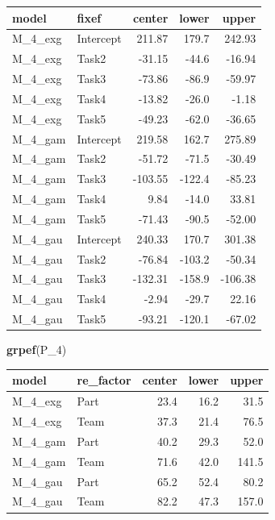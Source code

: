 \documentclass[]{svmono}
\newenvironment{Shaded}{\begin{snugshade}}{\end{snugshade}}
\newcommand{\KeywordTok}[1]{\textcolor[rgb]{0.13,0.29,0.53}{\textbf{#1}}}
\newcommand{\DataTypeTok}[1]{\textcolor[rgb]{0.13,0.29,0.53}{#1}}
\newcommand{\DecValTok}[1]{\textcolor[rgb]{0.00,0.00,0.81}{#1}}
\newcommand{\StringTok}[1]{\textcolor[rgb]{0.31,0.60,0.02}{#1}}
\newcommand{\OperatorTok}[1]{\textcolor[rgb]{0.81,0.36,0.00}{\textbf{#1}}}
\newcommand{\NormalTok}[1]{#1}
\begin{document}
\begin{longtable}[]{@{}llrrr@{}}
\toprule
model & fixef & center & lower & upper\tabularnewline
\midrule
\endhead
M\_4\_exg & Intercept & 211.87 & 179.7 & 242.93\tabularnewline
M\_4\_exg & Task2 & -31.15 & -44.6 & -16.94\tabularnewline
M\_4\_exg & Task3 & -73.86 & -86.9 & -59.97\tabularnewline
M\_4\_exg & Task4 & -13.82 & -26.0 & -1.18\tabularnewline
M\_4\_exg & Task5 & -49.23 & -62.0 & -36.65\tabularnewline
M\_4\_gam & Intercept & 219.58 & 162.7 & 275.89\tabularnewline
M\_4\_gam & Task2 & -51.72 & -71.5 & -30.49\tabularnewline
M\_4\_gam & Task3 & -103.55 & -122.4 & -85.23\tabularnewline
M\_4\_gam & Task4 & 9.84 & -14.0 & 33.81\tabularnewline
M\_4\_gam & Task5 & -71.43 & -90.5 & -52.00\tabularnewline
M\_4\_gau & Intercept & 240.33 & 170.7 & 301.38\tabularnewline
M\_4\_gau & Task2 & -76.84 & -103.2 & -50.34\tabularnewline
M\_4\_gau & Task3 & -132.31 & -158.9 & -106.38\tabularnewline
M\_4\_gau & Task4 & -2.94 & -29.7 & 22.16\tabularnewline
M\_4\_gau & Task5 & -93.21 & -120.1 & -67.02\tabularnewline
\bottomrule
\end{longtable}

\begin{Shaded}
\begin{Highlighting}[]
\KeywordTok{grpef}\NormalTok{(P_}\DecValTok{4}\NormalTok{)  }
\end{Highlighting}
\end{Shaded}

\begin{longtable}[]{@{}llrrr@{}}
\toprule
model & re\_factor & center & lower & upper\tabularnewline
\midrule
\endhead
M\_4\_exg & Part & 23.4 & 16.2 & 31.5\tabularnewline
M\_4\_exg & Team & 37.3 & 21.4 & 76.5\tabularnewline
M\_4\_gam & Part & 40.2 & 29.3 & 52.0\tabularnewline
M\_4\_gam & Team & 71.6 & 42.0 & 141.5\tabularnewline
M\_4\_gau & Part & 65.2 & 52.4 & 80.2\tabularnewline
M\_4\_gau & Team & 82.2 & 47.3 & 157.0\tabularnewline
\bottomrule
\end{longtable}

\begin{Shaded}
\end{Shaded}
\end{document}
